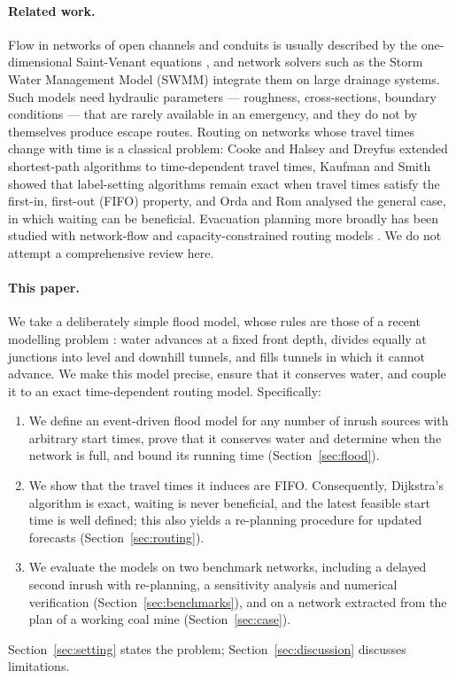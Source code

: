\documentclass[11pt,a4paper]{article}
\theoremstyle{plain}
\theoremstyle{definition}
\theoremstyle{remark}
\begin{document}
\paragraph{Related work.} Flow in networks of open channels and conduits is usually described by the one-dimensional Saint-Venant equations \cite{chow, cunge}, and network solvers such as the Storm Water Management Model (SWMM) \cite{swmm} integrate them on large drainage systems. Such models need hydraulic parameters --- roughness, cross-sections, boundary conditions --- that are rarely available in an emergency, and they do not by themselves produce escape routes. Routing on networks whose travel times change with time is a classical problem: Cooke and Halsey \cite{cooke} and Dreyfus \cite{dreyfus} extended shortest-path algorithms to time-dependent travel times, Kaufman and Smith \cite{kaufman} showed that label-setting algorithms remain exact when travel times satisfy the first-in, first-out (FIFO) property, and Orda and Rom \cite{orda} analysed the general case, in which waiting can be beneficial. Evacuation planning more broadly has been studied with network-flow and capacity-constrained routing models \cite{hamacher, lu}. We do not attempt a comprehensive review here.

\paragraph{This paper.} We take a deliberately simple flood model, whose rules are those of a recent modelling problem \cite{cumcm}: water advances at a fixed front depth, divides equally at junctions into level and downhill tunnels, and fills tunnels in which it cannot advance. We make this model precise, ensure that it conserves water, and couple it to an exact time-dependent routing model. Specifically:
\begin{enumerate}[leftmargin=2em, itemsep=1pt, topsep=2pt]
  \item We define an event-driven flood model for any number of inrush sources with arbitrary start times, prove that it conserves water and determine when the network is full, and bound its running time (Section~\ref{sec:flood}).
  \item We show that the travel times it induces are FIFO. Consequently, Dijkstra's algorithm is exact, waiting is never beneficial, and the latest feasible start time is well defined; this also yields a re-planning procedure for updated forecasts (Section~\ref{sec:routing}).
  \item We evaluate the models on two benchmark networks, including a delayed second inrush with re-planning, a sensitivity analysis and numerical verification (Section~\ref{sec:benchmarks}), and on a network extracted from the plan of a working coal mine (Section~\ref{sec:case}).
\end{enumerate}
Section~\ref{sec:setting} states the problem; Section~\ref{sec:discussion} discusses limitations.
\end{document}

